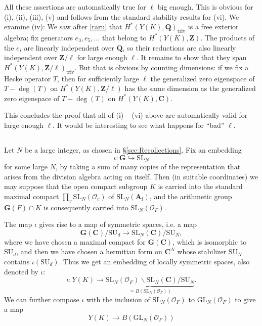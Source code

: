 \documentclass[10pt]{amsart}
\newcommand{\Z}{\mathbf{Z}}
\newcommand{\Afinite}{\mathbf{A}_{\mathrm{f}}}
\newcommand{\triv}{\mathrm{triv}}
\newcommand{\SL}{\mathrm{SL}}
\newcommand{\Q}{\mathbf{Q}}
\newcommand{\C}{\mathbf{C}}
\newcommand{\OO}{\mathcal{O}}
\newcommand{\GL}{\mathrm{GL}}
\theoremstyle{remark}
\newcommand{\GG}{\mathbf{G}}
\begin{document}
All these assertions are automatically true for $\ell$ big enough. This is obvious for (i), (ii), (iii), (v) and follows from the standard stability results for (vi). We examine (iv): 
We saw  after \eqref{raru} that 
$H^*(Y(K), \Q)_{\triv} $
is a free exterior algebra; fix generators $e_3, e_5, \dots$ that belong to $H^*(Y(K), \Z)$. 
%
%
%
The products of the $e_i$ are linearly independent over $\Q$, so their reductions are also  linearly independent over $\Z/\ell$ for large enough $\ell$.
It remains to show that they span $H^*(Y(K), \Z/\ell)_{\triv}$. 
But that is obvious by counting dimensions: if we fix a Hecke operator $T$, then 
for sufficiently large $\ell$ the generalized zero eigenspace of  $T-\deg(T)$  on $H^*(Y(K), \Z/\ell)$ 
has the same dimension as the generalized zero eigenspace of $T-\deg(T)$ on $H^*(Y(K), \C)$.
 
 This concludes the proof that all of (i) -- (vi) above are automatically valid for large enough $\ell$. 
It would be interesting to see what happens for ``bad'' $\ell$. 
\subsection{} 
Let $N$ be a large integer, as chosen  in \S \ref{sec:Recollections}.  
Fix an embedding 
\begin{equation} \label{iotadef}  \iota: \GG \hookrightarrow \SL_N\end{equation}
for some large $N$, by taking a sum of many copies of the representation
that arises from   the division algebra  acting on itself. 
 Then (in suitable coordinates) we may suppose that the open compact subgroup $K$ is carried into the standard maximal compact $\prod_{v} \SL_N(\mathcal{O}_{v})$ of $\SL_N(\Afinite)$,  and the arithmetic group $\GG(F) \cap K$ is consequently carried into $\SL_N(\OO_F)$. 

The map $\iota$ gives rise to a map of symmetric spaces, i.e. a map $$\GG(\C)/\mathrm{SU}_d \rightarrow
\SL_N(\C)/\mathrm{SU}_N,$$
where we have chosen a maximal compact for $\GG(\C)$, which is isomorphic to $\mathrm{SU}_d$,
and then we have chosen a hermitian form on $\C^N$ whose stabilizer $\mathrm{SU}_N$ contains $\iota(\mathrm{SU}_d)$. 
Thus we get an  embedding of locally symmetric spaces,   also denoted by $\iota$: 
\begin{equation} \label{def of iota} \iota: Y(K) \rightarrow   \underbrace{ \SL_N(\OO_F) \backslash \SL_N(\C)/\mathrm{SU}_N}_{\simeq B(\SL_N(\OO_F))}.\end{equation}
 We can further compose $\iota$ with the inclusion of $\SL_N(\OO_F)$ to $\GL_N(\OO_F)$ to give
 a map
 $$Y(K) \rightarrow B(\GL_N(\OO_F))$$
 
\end{document}
